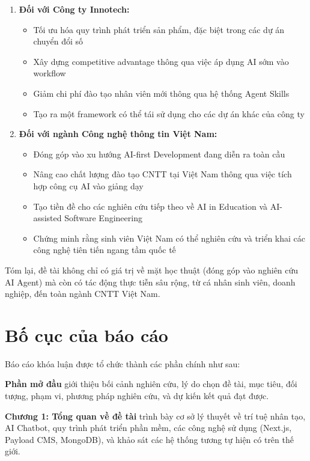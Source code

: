 \documentclass[13pt,a4paper,oneside]{extreport}
\numberwithin{equation}{chapter}
\numberwithin{figure}{chapter}
\numberwithin{table}{chapter}
\begin{document}
\begin{enumerate}
    \item \textbf{Đối với Công ty Innotech:}
    \begin{itemize}
        \item Tối ưu hóa quy trình phát triển sản phẩm, đặc biệt trong các dự án chuyển đổi số
        \item Xây dựng competitive advantage thông qua việc áp dụng AI sớm vào workflow
        \item Giảm chi phí đào tạo nhân viên mới thông qua hệ thống Agent Skills
        \item Tạo ra một framework có thể tái sử dụng cho các dự án khác của công ty
    \end{itemize}

    \item \textbf{Đối với ngành Công nghệ thông tin Việt Nam:}
    \begin{itemize}
        \item Đóng góp vào xu hướng AI-first Development đang diễn ra toàn cầu
        \item Nâng cao chất lượng đào tạo CNTT tại Việt Nam thông qua việc tích hợp công cụ AI vào giảng dạy
        \item Tạo tiền đề cho các nghiên cứu tiếp theo về AI in Education và AI-assisted Software Engineering
        \item Chứng minh rằng sinh viên Việt Nam có thể nghiên cứu và triển khai các công nghệ tiên tiến ngang tầm quốc tế
    \end{itemize}
\end{enumerate}

Tóm lại, đề tài không chỉ có giá trị về mặt học thuật (đóng góp vào nghiên cứu AI Agent) mà còn có tác động thực tiễn sâu rộng, từ cá nhân sinh viên, doanh nghiệp, đến toàn ngành CNTT Việt Nam.

\section*{Bố cục của báo cáo}

Báo cáo khóa luận được tổ chức thành các phần chính như sau:

\textbf{Phần mở đầu} giới thiệu bối cảnh nghiên cứu, lý do chọn đề tài, mục tiêu, đối tượng, phạm vi, phương pháp nghiên cứu, và dự kiến kết quả đạt được.

\textbf{Chương 1: Tổng quan về đề tài} trình bày cơ sở lý thuyết về trí tuệ nhân tạo, AI Chatbot, quy trình phát triển phần mềm, các công nghệ sử dụng (Next.js, Payload CMS, MongoDB), và khảo sát các hệ thống tương tự hiện có trên thế giới.
\end{document}
